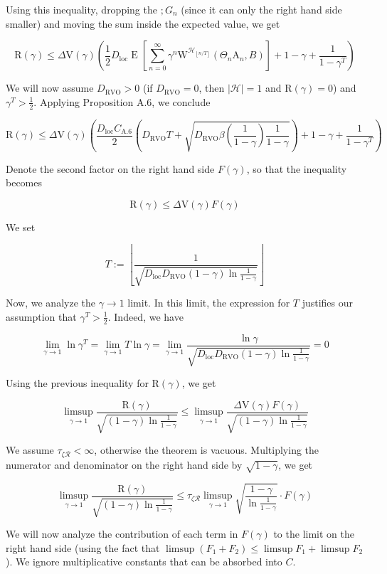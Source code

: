 \documentclass[a4paper]{article}
\newcommand{\AP}[1]{\left(#1\right)}
\newcommand{\AB}[1]{\left[#1\right]}
\newcommand{\Ea}[2]{\underset{#1}{\operatorname{E}}\AB{#2}}
\newcommand{\Abs}[1]{\left\vert #1 \right\vert}
\newcommand{\Floor}[1]{\left\lfloor #1 \right\rfloor}
\newcommand{\R}{\mathcal{R}}
\newcommand{\Hy}{\mathcal{H}}
\newcommand{\DRVO}{D_{\mathrm{RVO}}}
\newcommand{\DL}{D_{\mathrm{loc}}}
\newcommand{\V}{\mathrm{V}}
\newcommand{\Reg}{\mathrm{R}}
\newcommand{\W}{\mathrm{W}}
\newcommand{\AT}{\mathrm{A}}
\newcommand{\De}{\Delta}
\begin{document}
Using this inequality, dropping the $;G_n$ (since it can only the right hand side smaller) and moving the sum inside the expected value, we get

$$\Reg(\gamma)\leq\Delta\V(\gamma)\AP{\frac{1}{2}\DL\Ea{}{\sum_{n=0}^\infty\gamma^{n}\W^{\Hy_{\Floor{n/T}}}\AP{\Theta_n\AT_n,B} }+1-\gamma+\frac{1}{1-\gamma^T}}$$

We will now assume $\DRVO>0$ (if $\DRVO=0$, then $\Abs{\Hy}=1$ and $\Reg(\gamma)=0$) and $\gamma^T>\frac{1}{2}$. Applying Proposition A.6, we conclude

$$\Reg(\gamma)\leq\Delta\V(\gamma)\AP{\frac{\DL C_{\mathrm{A.6}}}{2}\AP{\DRVO T+\sqrt{\DRVO\beta\AP{\frac{1}{1-\gamma}}\frac{1}{1-\gamma}}}+1-\gamma+\frac{1}{1-\gamma^T}}$$

Denote the second factor on the right hand side $F(\gamma)$, so that the inequality becomes 

$$\Reg(\gamma)\leq\De\V(\gamma)F(\gamma)$$

We set

$$T:=\Floor{\frac{1}{\sqrt{\DL\DRVO(1-\gamma)\ln\frac{1}{1-\gamma}}}}$$

Now, we analyze the $\gamma\rightarrow1$ limit. In this limit, the expression for $T$ justifies our assumption that $\gamma^T>\frac{1}{2}$. Indeed, we have

$$\lim_{\gamma\rightarrow1}\ln{\gamma^T}=\lim_{\gamma\rightarrow1}T\ln\gamma=\lim_{\gamma\rightarrow1}\frac{\ln\gamma}{\sqrt{\DL\DRVO(1-\gamma)\ln\frac{1}{1-\gamma}}}=0$$

Using the previous inequality for $\Reg(\gamma)$, we get

$$\limsup_{\gamma\rightarrow1}{\frac{\Reg(\gamma)}{\sqrt{(1-\gamma)\ln{\frac{1}{1-\gamma}}}}}\leq \limsup_{\gamma\rightarrow1}{\frac{\De\V(\gamma)F(\gamma)}{\sqrt{(1-\gamma)\ln{\frac{1}{1-\gamma}}}}}$$

We assume $\tau_{\zeta\R}<\infty$, otherwise the theorem is vacuous. Multiplying the numerator and denominator on the right hand side by $\sqrt{1-\gamma}$, we get

$$\limsup_{\gamma\rightarrow1}{\frac{\Reg(\gamma)}{\sqrt{(1-\gamma)\ln{\frac{1}{1-\gamma}}}}}\leq  \tau_{\zeta\R}\limsup_{\gamma\rightarrow1}{\sqrt{\frac{1-\gamma}{\ln{\frac{1}{1-\gamma}}}}\cdot F(\gamma)}$$

We will now analyze the contribution of each term in $F(\gamma)$ to the limit on the right hand side (using the fact that $\limsup\AP{F_1+F_2}\leq\limsup{F_1}+\limsup{F_2}$). We ignore multiplicative constants that can be absorbed into $C$.
\end{document}
